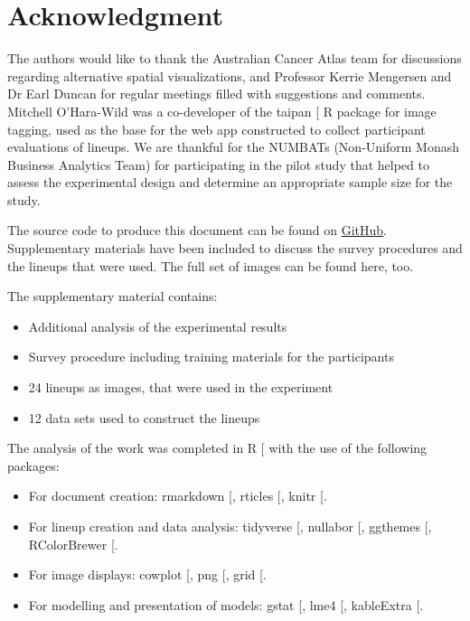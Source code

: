 \documentclass[
]{article}
\providecommand{\tightlist}{%
  \setlength{\itemsep}{0pt}\setlength{\parskip}{0pt}}
\begin{document}
\section{Acknowledgment}\label{acknowledgment}

The authors would like to thank the Australian Cancer Atlas team for
discussions regarding alternative spatial visualizations, and Professor
Kerrie Mengersen and Dr Earl Duncan for regular meetings filled with
suggestions and comments. Mitchell O'Hara-Wild was a co-developer of the
taipan {[}\citeproc{ref-taipan}{20}{]} R package for image tagging, used
as the base for the web app constructed to collect participant
evaluations of lineups. We are thankful for the NUMBATs (Non-Uniform
Monash Business Analytics Team) for participating in the pilot study
that helped to assess the experimental design and determine an
appropriate sample size for the study.

The source code to produce this document can be found on
\href{https://github.com/srkobakian/experiment/paper}{GitHub}.
Supplementary materials have been included to discuss the survey
procedures and the lineups that were used. The full set of images can be
found here, too.

The supplementary material contains:

\begin{itemize}
\tightlist
\item
  Additional analysis of the experimental results
\item
  Survey procedure including training materials for the participants
\item
  24 lineups as images, that were used in the experiment
\item
  12 data sets used to construct the lineups
\end{itemize}

The analysis of the work was completed in R
{[}\citeproc{ref-RCore}{18}{]} with the use of the following packages:

\begin{itemize}
\tightlist
\item
  For document creation: rmarkdown {[}\citeproc{ref-rmarkdown}{23}{]},
  rticles {[}\citeproc{ref-rticles}{24}{]}, knitr
  {[}\citeproc{ref-knitr}{25}{]}.
\item
  For lineup creation and data analysis: tidyverse
  {[}\citeproc{ref-tidyverse}{26}{]}, nullabor
  {[}\citeproc{ref-nullabor}{27}{]}, ggthemes
  {[}\citeproc{ref-ggthemes}{28}{]}, RColorBrewer
  {[}\citeproc{ref-RColorBrewer}{29}{]}.
\item
  For image displays: cowplot {[}\citeproc{ref-cowplot}{30}{]}, png
  {[}\citeproc{ref-png}{31}{]}, grid {[}\citeproc{ref-grid}{32}{]}.
\item
  For modelling and presentation of models: gstat
  {[}\citeproc{ref-gstat}{17}{]}, lme4 {[}\citeproc{ref-lme4}{19}{]},
  kableExtra {[}\citeproc{ref-kableExtra}{33}{]}.
\end{itemize}
\end{document}
